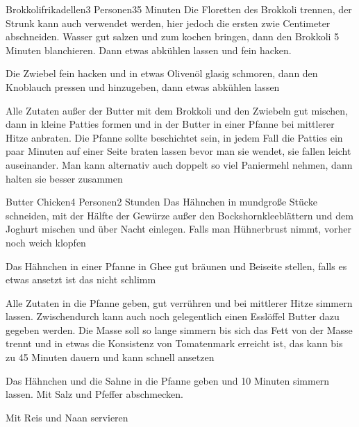 \begin{recipe}{Brokkolifrikadellen}{3 Personen}{35 Minuten}
Die Floretten des Brokkoli trennen, der Strunk kann auch verwendet werden, hier jedoch die ersten zwie Centimeter abschneiden. Wasser gut salzen und zum kochen bringen, dann den Brokkoli 5 Minuten blanchieren. Dann etwas abkühlen lassen und fein hacken.

Die Zwiebel fein hacken und in etwas Olivenöl glasig schmoren, dann den Knoblauch pressen und hinzugeben, dann etwas abkühlen lassen

Alle Zutaten außer der Butter mit dem Brokkoli und den Zwiebeln gut mischen, dann in kleine Patties formen und in der Butter in einer Pfanne bei mittlerer Hitze anbraten. Die Pfanne sollte beschichtet sein, in jedem Fall die Patties ein paar Minuten auf einer Seite braten lassen bevor man sie wendet, sie fallen leicht auseinander. Man kann alternativ auch doppelt so viel Paniermehl nehmen, dann halten sie besser zusammen
\end{recipe}


\begin{recipe}{Butter Chicken}{4 Personen}{2 Stunden}
Das Hähnchen in mundgroße Stücke schneiden, mit der Hälfte der Gewürze außer den Bockshornkleeblättern und dem Joghurt mischen und über Nacht einlegen. Falls man Hühnerbrust nimmt, vorher noch weich klopfen

Das Hähnchen in einer Pfanne in Ghee gut bräunen und Beiseite stellen, falls es etwas ansetzt ist das nicht schlimm

Alle Zutaten in die Pfanne geben, gut verrühren und bei mittlerer Hitze simmern lassen.  Zwischendurch kann auch noch gelegentlich einen Esslöffel Butter dazu gegeben werden. Die Masse soll so lange simmern bis sich das Fett von der Masse trennt und in etwas die Konsistenz von Tomatenmark erreicht ist, das kann bis zu 45 Minuten dauern und kann schnell ansetzen


Das Hähnchen und die Sahne in die Pfanne geben und 10 Minuten simmern lassen. Mit Salz und Pfeffer abschmecken.

Mit Reis und Naan servieren
\end{recipe}

